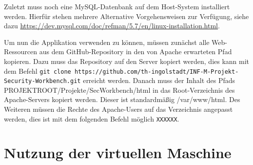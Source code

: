 Zuletzt muss noch eine MySQL-Datenbank auf dem Host-System installiert werden. Hierfür stehen mehrere Alternative Vorgehensweisen zur Verfügung, siehe dazu \url{https://dev.mysql.com/doc/refman/5.7/en/linux-installation.html}.\medskip

Um nun die Applikation verwenden zu können, müssen zunächst alle Web-Ressourcen aus dem GitHub-Repository in den von Apache erwarteten Pfad kopieren. Dazu muss das Repository auf den Server kopiert werden, dies kann mit dem Befehl \colorbox{altgray}{\lstinline|git clone https://github.com/th-ingolstadt/INF-M-Projekt-Security-Workbench.git|} erreicht werden. Danach muss der Inhalt des Pfads PROJEKTROOT/Projekte/SecWorkbench/html in das Root-Verzeichnis des Apache-Servers kopiert werden. Dieser ist standardmäßig /var/www/html. Des Weiteren müssen die Rechte des Apache-Users auf das Verzeichnis angepasst werden, dies ist mit dem folgenden Befehl möglich \colorbox{altgray}{\lstinline|XXXXXX|}.

\section{Nutzung der virtuellen Maschine}


